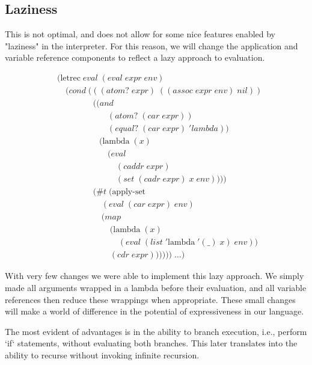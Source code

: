 \subsection{Laziness}
This is not optimal, and does not allow for some nice features enabled by 
"laziness" in the interpreter. For this reason, we will change the 
application and variable reference components to reflect a lazy approach to 
evaluation.

\begin{align*}
& (\text{letrec} \; eval \; (eval \; expr \; env)
\\& \quad (cond \; (((atom? \; expr) \; ((assoc \; expr \; env) \; nil))
\\& \qquad \qquad \; ((and \; 
\\& \qquad \qquad \qquad (atom? \; (car \; expr)) \; 
\\& \qquad \qquad \qquad (equal? \; (car \; expr) \; 'lambda)) \; 
\\& \qquad \qquad \quad (\text{lambda} \; (x) \; 
\\& \qquad \qquad \qquad (eval \; 
\\& \qquad \qquad \qquad \quad (caddr \; expr) \; 
\\& \qquad \qquad \qquad \quad (set \; (cadr \; expr) \; x \; env))))
\\& \qquad \qquad \; (\#t \; (\text{apply-set} \; 
\\& \qquad \qquad \quad \; (eval \; (car \; expr) \; env) \; 
\\& \qquad \qquad \quad \; (map \; 
\\& \qquad \qquad \qquad \; (\text{lambda} \; (x) \; 
\\& \qquad \qquad \qquad \quad \; (eval \; (list \; '\text{lambda} \; '(\_) \; x) \; env)) \; 
\\& \qquad \qquad \qquad \; (cdr \; expr)))))) \; \dots)
\end{align*}

With very few changes we were able to implement this lazy approach. We simply 
made all arguments wrapped in a lambda before their evaluation, and all 
variable references then reduce these wrappings when appropriate. These small 
changes will make a world of difference in the potential of expressiveness in 
our language.

The most evident of advantages is in the ability to branch execution, i.e., 
perform `if` statements, without evaluating both branches. This later 
translates into the ability to recurse without invoking infinite recursion.

